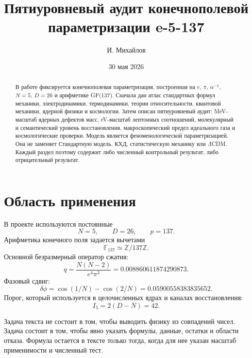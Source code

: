 \documentclass[11pt]{article}
\title{Пятиуровневый аудит конечнополевой параметризации e-5-137}
\author{И. Михайлов}
\affil{Независимый исследователь, Москва, Россия}
\date{30 мая 2026}
\begin{document}
\maketitle

\begin{abstract}
В работе фиксируется конечнополевая параметризация, построенная на $e$, $\pi$,
$\alpha^{-1}$, $N=5$, $D=26$ и арифметике GF(137).  Сначала дан атлас
стандартных формул механики, электродинамики, термодинамики, теории
относительности, квантовой механики, ядерной физики и космологии.  Затем
описан пятиуровневый аудит: MeV-масштаб ядерных дефектов масс, eV-масштаб
лептонных соотношений, молекулярный и семантический уровень восстановления,
макроскопический предел идеального газа и космологические проверки.  Модель
является феноменологической параметризацией.  Она не заменяет Стандартную
модель, КХД, статистическую механику или $\Lambda$CDM.  Каждый раздел поэтому
содержит либо численный контрольный результат, либо отрицательный результат.
\end{abstract}

\section{Область применения}

В проекте используются постоянные
\begin{equation}
    N=5,\qquad D=26,\qquad p=137.
\end{equation}
Арифметика конечного поля задается вычетами
\begin{equation}
    \mathbb{F}_{137}\simeq\mathbb{Z}/137\mathbb{Z}.
\end{equation}
Основной безразмерный оператор сжатия:
\begin{equation}
    q=\frac{N(N-2)}{e^4\pi^3}
      =0.008860611874290873.
\end{equation}
Фазовый сдвиг:
\begin{equation}
    \delta\phi=\cos(1/N)-\cos(2/N)
              =0.05900558383835652.
\end{equation}
Порог, который используется в целочисленных ядрах и каналах восстановления:
\begin{equation}
    I_5=2(D-N)=42.
\end{equation}

Задача текста не состоит в том, чтобы выводить физику из совпадений чисел.
Задача состоит в том, чтобы явно указать формулы, данные, остатки и области
отказа.  Формула остается в тексте только тогда, когда для нее указан масштаб
применимости и численный тест.
\end{document}
